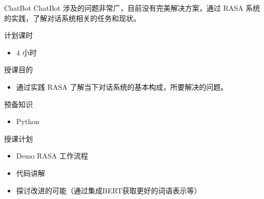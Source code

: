 \documentclass[10pt,aspectratio=43,mathserif,table]{beamer}
\begin{document}
\begin{frame}{ChatBot}
ChatBot 涉及的问题非常广，目前没有完美解决方案，通过 RASA 系统的实践，了解对话系统相关的任务和现状。
\begin{block}{}
	计划课时
	\begin{itemize}
		\item<0-> 4 小时
	\end{itemize}

	授课目的
	\begin{itemize}
		\item<0-> 通过实践 RASA 了解当下对话系统的基本构成，所要解决的问题。
	\end{itemize}

	预备知识
	\begin{itemize}
		\item<0-> Python
	\end{itemize}

	授课计划
	\begin{itemize}
		\item<0-> Demo RASA 工作流程
		\item<0-> 代码讲解
		\item<0-> 探讨改进的可能（通过集成BERT获取更好的词语表示等）
	\end{itemize}

\end{block}
\end{frame}


\end{document}
